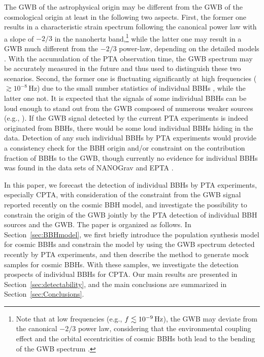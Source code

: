 \documentclass[twocolumn]{aastex631}
\newcommand{\hz}{{\rm\,Hz}}
\begin{document}
The GWB of the astrophysical origin may be different from the GWB of the
cosmological origin at least in the following two aspects. 
%
First, the former one results in a characteristic strain spectrum following the
canonical power law with a slope of $-2/3$ in the nanohertz band,\footnote{
Note that at low frequencies (e.g., $f\lesssim 10^{-9}\hz$), the
GWB may deviate from the canonical $-2/3$ power law, considering
that the environmental coupling effect \citep{BBR80, Kocsis11} and the orbital
eccentricities of cosmic BBHs  \citep{Enoki07} both lead to the bending of the
GWB spectrum \citep{ChenSY17, Rasskazov17,CYL20bbh}.
} while the latter one may
result in a GWB much different from the $-2/3$ power-law, depending on the
detailed models \citep{NG23alter, Ellis23}. 
%
With the accumulation of the PTA observation time, the GWB spectrum may be
accurately measured in the future and thus used to distinguish these two
scenarios. Second, the former one is fluctuating significantly at high
frequencies ($\gtrsim 10^{-8}$\,Hz) due to the small number statistics of
individual BBHs \citep{Sesana08, Roebber16, CYL20bbh}, while the latter one not.
It is expected that the signals of some individual BBHs can be loud enough to
stand out from the GWB composed of numerous weaker sources (e.g.,
\citealt{Rajagopal95, Sesana09, Ravi15, Rosado15, Mingarelli17, Kelley18,
CYL20bbh, Gardiner23, Valtolina23}). If the GWB signal detected by the current
PTA experiments is indeed originated from BBHs, there would be some loud
individual BBHs hiding in the data. Detection of any such individual BBHs by PTA
experiments would provide a consistency check for the BBH origin and/or
constraint on the contribution fraction of BBHs to the GWB, though currently no
evidence for individual BBHs was found in the data sets of NANOGrav
\citep{NG23indv} and EPTA \citep{EPTA23indv}. 

In this paper, we forecast the detection of individual BBHs by PTA experiments,
especially CPTA, with consideration of the constraint from the GWB signal
reported recently on the cosmic BBH model, and investigate the possibility to
constrain the origin of the GWB jointly by the PTA detection of individual BBH
sources and the GWB. The paper is organized as follows. In
Section~\ref{sec:BBHmodel}, we first briefly introduce the population synthesis
model for cosmic BBHs and constrain the model by using the GWB spectrum detected
recently by PTA experiments, and then describe the method to generate mock
samples for cosmic BBHs. With these samples, we investigate the detection
prospects of individual BBHs for CPTA. Our main results are presented in
Section~\ref{sec:detectability}, and the main conclusions are summarized in
Section~\ref{sec:Conclusions}.
\end{document}
